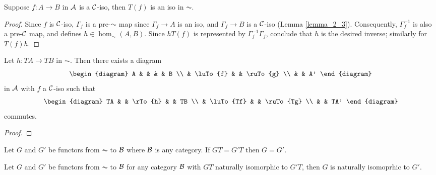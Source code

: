 \begin{lem}\label{lemma_2_8}
Suppose $f: A \to B$ in $\mathcal{A}$ is a $\mathcal{C}$-iso,
then $T(f)$ is an iso in $\AC$.
\end{lem}
\begin{proof}
Since $f$ is $\mathcal{C}$-iso, $\Gamma_f$ is a pre-$\AC$ map
since $\Gamma_f \to A$ is an iso, and $\Gamma_f \to B$ is a
$\mathcal{C}$-iso (Lemma \ref{lemma_2_3}). Consequently,
$\Gamma_f^{-1}$ is also a pre-$\mathcal{C}$ map, and defines
$h \in \hom_{\AC}(A,B)$. Since $hT(f)$ is represented by
$\Gamma_f^{-1}\Gamma_f$, conclude that $h$ is the desired
inverse; similarly for $T(f)h$.
\end{proof}

\begin{lem}
Let $h: TA \to TB$ in $\AC$. Then there exists a diagram
\[
\begin{diagram}
A &          &    &          & B \\
  & \luTo{f} &    & \ruTo{g} \\
  &          & A'
\end{diagram}
\]
in $\mathcal{A}$ with $f$ a $\mathcal{C}$-iso such that
\[
\begin{diagram}
TA &           & \rTo{h} &           & TB \\
   & \luTo{Tf} &         & \ruTo{Tg} \\
   &           & TA'
\end{diagram}
\]
commutes.
\end{lem}
\begin{proof}

\end{proof}

\begin{prop}
Let $G$ and $G'$ be functors from $\AC$ to $\mathcal{B}$ where 
$\mathcal{B}$ is any category. If $GT = G'T$ then $G = G'$.
\end{prop}

\begin{prop}
Let $G$ and $G'$ be functors from $\AC$ to $\mathcal{B}$ for any 
category $\mathcal{B}$ with $GT$ naturally isomorphic to $G'T$,
then $G$ is naturally isomoprhic to $G'$.
\end{prop}
